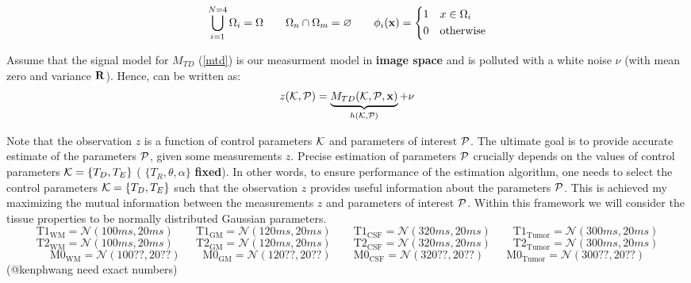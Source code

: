 \documentclass{article}         %
\theoremstyle{definition}
\theoremstyle{remark}
\newcommand{\eqn}[1]{(\ref{#1})}
\begin{document}
	
\[
\bigcup_{i=1}^{N=4}\Omega_i=\Omega  \qquad  \Omega_n\cap\Omega_m=\varnothing
\qquad 
\phi_i(\mathbf{x})=\left\{ \begin{split}
			1 & \quad x\in\Omega_i \\
			0 & \quad \text{otherwise}
                     \end{split} \right. 
\]


Assume that the signal model  for $M_{TD}$ \eqn{mtd} is our measurment model in \textbf{image space}
and is polluted with a white noise $\nu$ (with mean zero and variance $\mathbf{R}$). Hence,  can be written as:
\begin{equation}\label{mtdobs}
z(\mathcal{K},\mathcal{P})=\underbrace{M_{TD}(\mathcal{K},\mathcal{P},\mathbf{x})}_{h(\mathcal{K},\mathcal{P})}+\nu
\end{equation}


Note that the observation $z$ is a function of control parameters $\mathcal{K}$ and
parameters of interest $\mathcal{P}$.  The ultimate goal is to provide accurate estimate
of the parameters $\mathcal{P}$, given some measurements $z$. 
Precise estimation of parameters $\mathcal{P}$ crucially depends on the values of
control parameters $\mathcal{K}=\{T_D,T_E\}$ ( $\{T_R,\theta,\alpha\}$ \textbf{fixed}).  
In other words, to ensure
performance of the estimation algorithm, one needs to select the control
parameters $\mathcal{K}=\{T_D,T_E\}$ such that the observation $z$ provides
useful information about the parameters $\mathcal{P}$. This is achieved my maximizing
the mutual information between the measurements $z$ and parameters of interest
$\mathcal{P}$.  Within this framework we will consider the tissue properties to be
normally distributed Gaussian parameters.
\[
  \text{T1}_\text{WM}    =  \mathcal{N}(100ms, 20ms)  \qquad
  \text{T1}_\text{GM}    =  \mathcal{N}(120ms, 20ms)  \qquad
  \text{T1}_\text{CSF}   =  \mathcal{N}(320ms, 20ms)  \qquad
  \text{T1}_\text{Tumor} =  \mathcal{N}(300ms, 20ms)
\]
\[
  \text{T2}_\text{WM}    =  \mathcal{N}(100ms, 20ms)  \qquad
  \text{T2}_\text{GM}    =  \mathcal{N}(120ms, 20ms)  \qquad
  \text{T2}_\text{CSF}   =  \mathcal{N}(320ms, 20ms)  \qquad
  \text{T2}_\text{Tumor} =  \mathcal{N}(300ms, 20ms)
\]
\[
  \text{M0}_\text{WM}    =  \mathcal{N}(100??, 20??)  \qquad
  \text{M0}_\text{GM}    =  \mathcal{N}(120??, 20??)  \qquad
  \text{M0}_\text{CSF}   =  \mathcal{N}(320??, 20??)  \qquad
  \text{M0}_\text{Tumor} =  \mathcal{N}(300??, 20??)
\]
{\color{red}(@kenphwang need exact numbers)}


\end{document}
